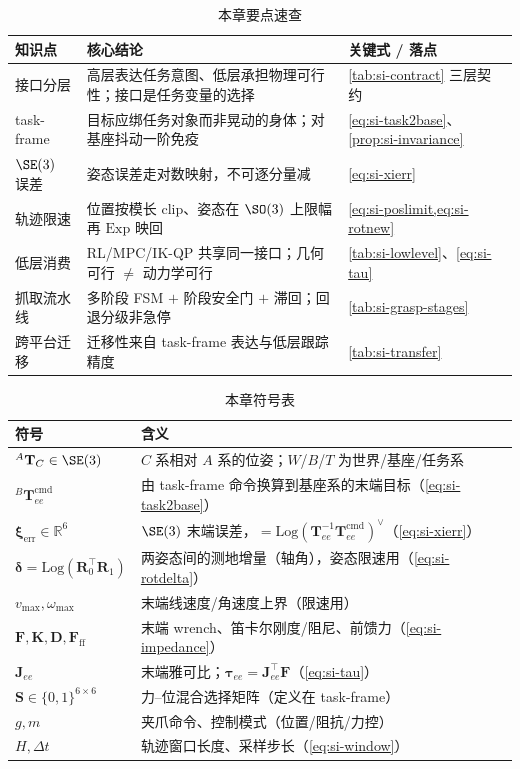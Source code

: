 \begin{table}[H]\centering\small
\caption{本章要点速查}
\label{tab:si-summary}
\begin{tabular}{p{2.6cm}p{5.4cm}p{4.4cm}}
\toprule
知识点 & 核心结论 & 关键式 / 落点 \\
\midrule
接口分层 & 高层表达任务意图、低层承担物理可行性；接口是任务变量的选择 & \cref{tab:si-contract} 三层契约 \\
task-frame & 目标应绑任务对象而非晃动的身体；对基座抖动一阶免疫 & \cref{eq:si-task2base}、\cref{prop:si-invariance} \\
$\SE(3)$ 误差 & 姿态误差走对数映射，不可逐分量减 & \cref{eq:si-xierr} \\
轨迹限速 & 位置按模长 clip、姿态在 $\SO(3)$ 上限幅再 $\mathrm{Exp}$ 映回 & \cref{eq:si-poslimit,eq:si-rotnew} \\
低层消费 & RL/MPC/IK-QP 共享同一接口；几何可行 $\neq$ 动力学可行 & \cref{tab:si-lowlevel}、\cref{eq:si-tau} \\
抓取流水线 & 多阶段 FSM $+$ 阶段安全门 $+$ 滞回；回退分级非急停 & \cref{tab:si-grasp-stages} \\
跨平台迁移 & 迁移性来自 task-frame 表达与低层跟踪精度 & \cref{tab:si-transfer} \\
\bottomrule
\end{tabular}
\end{table}

\begin{table}[H]\centering\small
\caption{本章符号表}
\label{tab:si-symbols}
\begin{tabular}{ll}
\toprule
符号 & 含义 \\
\midrule
${}^{A}\mathbf{T}_{C}\in\SE(3)$ & $C$ 系相对 $A$ 系的位姿；$W$/$B$/$T$ 为世界/基座/任务系 \\
${}^{B}\mathbf{T}_{ee}^{\mathrm{cmd}}$ & 由 task-frame 命令换算到基座系的末端目标（\cref{eq:si-task2base}） \\
$\boldsymbol\xi_{\mathrm{err}}\in\mathbb R^6$ & $\SE(3)$ 末端误差，$=\mathrm{Log}(\mathbf T_{ee}^{-1}\mathbf T_{ee}^{\mathrm{cmd}})^\vee$（\cref{eq:si-xierr}） \\
$\boldsymbol\delta=\mathrm{Log}(\mathbf R_0^\top\mathbf R_1)$ & 两姿态间的测地增量（轴角），姿态限速用（\cref{eq:si-rotdelta}） \\
$v_{\max},\omega_{\max}$ & 末端线速度/角速度上界（限速用） \\
$\mathbf F,\mathbf K,\mathbf D,\mathbf F_{\mathrm{ff}}$ & 末端 wrench、笛卡尔刚度/阻尼、前馈力（\cref{eq:si-impedance}） \\
$\mathbf J_{ee}$ & 末端雅可比；$\boldsymbol\tau_{ee}=\mathbf J_{ee}^\top\mathbf F$（\cref{eq:si-tau}） \\
$\mathbf S\in\{0,1\}^{6\times6}$ & 力--位混合选择矩阵（定义在 task-frame） \\
$g,m$ & 夹爪命令、控制模式（位置/阻抗/力控） \\
$H,\Delta t$ & 轨迹窗口长度、采样步长（\cref{eq:si-window}） \\
\bottomrule
\end{tabular}
\end{table}

